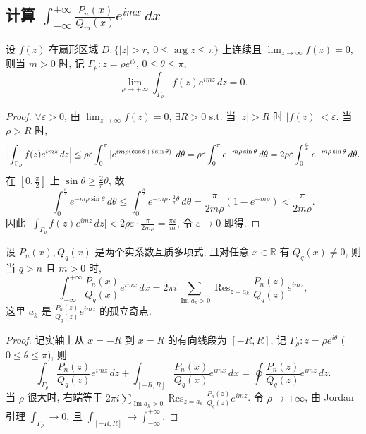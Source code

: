 \documentclass[theorem=false,mathfont=none,openany,sub3section]{easybook}
\begin{document}
\subsection{\texorpdfstring{计算 $\int_{-\infty}^{+\infty}\frac{P_{n}(x)}{Q_{m}(x)}e^{imx}\,dx$}{计算含指数因子的广义积分}}

\begin{lemma}[Jordan 引理]
  设 $f(z)$ 在扇形区域 $D:\{|z|>r,\ 0\leq\arg z\leq\pi\}$ 上连续且 $\lim_{z\to\infty}f(z)=0$, 则当 $m>0$ 时, 记 $\Gamma_{\rho}:z=\rho e^{i\theta}$, $0\leq\theta\leq\pi$,
  \[
  \lim_{\rho\to+\infty}\int_{\Gamma_{\rho}}f(z)e^{imz}\,dz=0.
  \]
\end{lemma}

\begin{proof}
  $\forall\varepsilon>0$, 由 $\lim_{z\to\infty}f(z)=0$, $\exists R>0$ s.t. 当 $|z|>R$ 时 $|f(z)|<\varepsilon$. 当 $\rho>R$ 时,
  \[
  \Bigl|\int_{\Gamma_{\rho}}f(z)e^{imz}\,dz\Bigr|
  \leq\rho\varepsilon\int_{0}^{\pi}|e^{im\rho(\cos\theta+i\sin\theta)}|\,d\theta
  =\rho\varepsilon\int_{0}^{\pi}e^{-m\rho\sin\theta}\,d\theta
  =2\rho\varepsilon\int_{0}^{\frac{\pi}{2}}e^{-m\rho\sin\theta}\,d\theta.
  \]
  在 $[0,\frac{\pi}{2}]$ 上 $\sin\theta\geq\frac{2}{\pi}\theta$, 故
  \[
  \int_{0}^{\frac{\pi}{2}}e^{-m\rho\sin\theta}\,d\theta
  \leq\int_{0}^{\frac{\pi}{2}}e^{-m\rho\cdot\frac{2}{\pi}\theta}\,d\theta
  =\frac{\pi}{2m\rho}(1-e^{-m\rho})<\frac{\pi}{2m\rho}.
  \]
  因此 $\bigl|\int_{\Gamma_{\rho}}f(z)e^{imz}\,dz\bigr|<2\rho\varepsilon\cdot\frac{\pi}{2m\rho}=\frac{\pi\varepsilon}{m}$, 令 $\varepsilon\to0$ 即得.
\end{proof}

\begin{theorem}
  设 $P_{n}(x),Q_{q}(x)$ 是两个实系数互质多项式, 且对任意 $x\in\mathbb{R}$ 有 $Q_{q}(x)\neq0$, 则当 $q>n$ 且 $m>0$ 时,
  \[
  \int_{-\infty}^{+\infty}\frac{P_{n}(x)}{Q_{q}(x)}e^{imx}\,dx
  =2\pi i\sum_{\operatorname{Im}a_{k}>0}\operatorname{Res}_{z=a_{k}}\frac{P_{n}(z)}{Q_{q}(z)}e^{imz},
  \]
  这里 $a_{k}$ 是 $\frac{P_{n}(z)}{Q_{q}(z)}e^{imz}$ 的孤立奇点.
\end{theorem}

\begin{proof}
  记实轴上从 $x=-R$ 到 $x=R$ 的有向线段为 $[-R,R]$, 记 $\Gamma_{\rho}:z=\rho e^{i\theta}$ ($0\leq\theta\leq\pi$), 则
  \[
  \int_{\Gamma_{\rho}}\frac{P_{n}(z)}{Q_{q}(z)}e^{imz}\,dz
  +\int_{[-R,R]}\frac{P_{n}(x)}{Q_{q}(x)}e^{imx}\,dx
  =\oint\frac{P_{n}(z)}{Q_{q}(z)}e^{imz}\,dz.
  \]
  当 $\rho$ 很大时, 右端等于 $2\pi i\sum_{\operatorname{Im}a_{k}>0}\operatorname{Res}_{z=a_{k}}\frac{P_{n}(z)}{Q_{q}(z)}e^{imz}$.
  令 $\rho\to+\infty$, 由 Jordan 引理 $\int_{\Gamma_{\rho}}\to0$, 且 $\int_{[-R,R]}\to\int_{-\infty}^{+\infty}$.
\end{proof}
\end{document}
